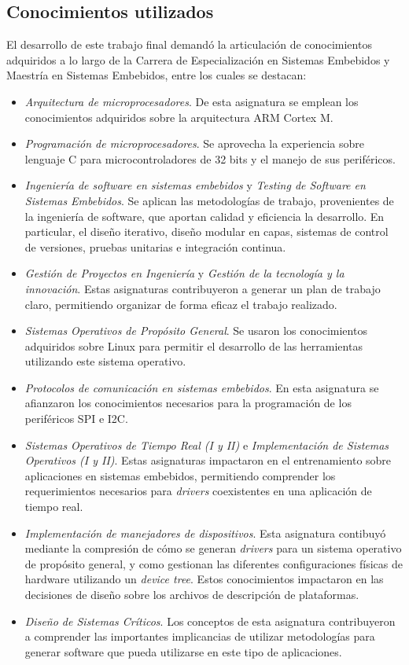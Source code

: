 

\subsection{Conocimientos utilizados}

El desarrollo de este trabajo final demandó la articulación de conocimientos adquiridos a lo largo de la Carrera de Especialización en Sistemas Embebidos y Maestría en Sistemas Embebidos, entre los cuales se destacan:

\begin{itemize}
\item
\emph{Arquitectura de microprocesadores}. De esta asignatura se emplean los conocimientos adquiridos sobre la arquitectura ARM Cortex M. 
\item
\emph{Programación de microprocesadores}. Se aprovecha la experiencia sobre lenguaje C para microcontroladores de 32 bits y el manejo de sus periféricos.
\item
\emph{Ingeniería de software en sistemas embebidos} y \emph{Testing de Software en Sistemas Embebidos}. Se aplican las metodologías de trabajo, provenientes de la ingeniería de software, que aportan calidad y eficiencia la desarrollo. En particular, el diseño iterativo, diseño modular en capas, sistemas de control de versiones, pruebas unitarias e integración  continua.
\item
\emph{Gestión de Proyectos en Ingeniería} y \emph{Gestión de la tecnología y la innovación}. Estas asignaturas contribuyeron a generar un plan de trabajo claro, permitiendo organizar de forma eficaz el trabajo realizado. 
\item
\emph{Sistemas Operativos de Propósito General}. Se usaron los conocimientos adquiridos sobre Linux para permitir el desarrollo de las herramientas utilizando este sistema operativo.
\item
\emph{Protocolos de comunicación en sistemas embebidos}. En esta asignatura se afianzaron los conocimientos necesarios para la programación de los periféricos SPI e I2C.
\item
\emph{Sistemas Operativos de Tiempo Real (I y II)} e \emph{Implementación de Sistemas Operativos (I y II)}. Estas asignaturas impactaron en el entrenamiento sobre aplicaciones en sistemas embebidos, permitiendo comprender los requerimientos necesarios para \emph{drivers} coexistentes en una aplicación de tiempo real.
\item
\emph{Implementación de manejadores de dispositivos}. Esta asignatura contibuyó mediante la compresión de cómo se generan \emph{drivers} para un sistema operativo de propósito general, y como gestionan las diferentes configuraciones físicas de hardware utilizando un \emph{device tree}. Estos conocimientos impactaron en las decisiones de diseño sobre los archivos de descripción de plataformas.
\item
\emph{Diseño de Sistemas Críticos}. Los conceptos de esta asignatura contribuyeron a comprender las importantes implicancias de utilizar metodologías para generar software que pueda utilizarse en este tipo de aplicaciones.
\end{itemize}

